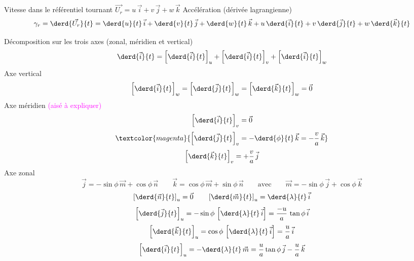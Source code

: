 \sk
Vitesse dans le référentiel tournant $\vec{U_r} = u\,\vec{i} + v\,\vec{j} + w\,\vec{k} $
\noindent Accélération (dérivée lagrangienne)
\[
\gamma_r = \derd{\vec{U_r}}{t}=\derd{u}{t}\,\vec{i}+\derd{v}{t}\,\vec{j}+\derd{w}{t}\,\vec{k} +u\,\derd{\vec{i}}{t}+v\,\derd{\vec{j}}{t}+w\,\derd{\vec{k}}{t}
\]


\sk
Décomposition sur les trois axes (zonal, méridien et vertical)
\[
\derd{\vec{i}}{t} = \left[ \derd{\vec{i}}{t} \right]_u + \left[ \derd{\vec{i}}{t} \right]_v + \left[ \derd{\vec{i}}{t} \right]_w
\]
\noindent Axe vertical
\[
\left[ \derd{\vec{i}}{t} \right]_w = \left[ \derd{\vec{j}}{t} \right]_w = \left[ \derd{\vec{k}}{t} \right]_w = \vec{0}
\]
\noindent Axe méridien \textcolor{magenta}{(aisé à expliquer)}
\[
\left[ \derd{\vec{i}}{t} \right]_v = \vec{0}
\]
\[
\textcolor{magenta}{\left[ \derd{\vec{j}}{t} \right]_v = - \derd{\phi}{t} \, \vec{k} = - \dfrac{v}{a} \, \vec{k}}
\]
\[
\left[ \derd{\vec{k}}{t} \right]_v = + \dfrac{v}{a} \, \vec{j}
\]
\noindent Axe zonal
\[
\vec{j} = -\sin\phi \, \vec{m} + \cos\phi \, \vec{n} \qquad \vec{k} =  \cos\phi \, \vec{m} + \sin\phi \, \vec{n} \qquad \textrm{avec} \qquad \vec{m} = -\sin\phi \, \vec{j} + \cos\phi \, \vec{k}
\]
\[
\left[ \derd{\vec{n}}{t} \right]_u = \vec{0} \qquad \left[ \derd{\vec{m}}{t} \right]_u = \derd{\lambda}{t} \, \vec{i}
\]
\[
\left[ \derd{\vec{j}}{t} \right]_u = -\sin\phi \, \left[ \derd{\lambda}{t} \, \vec{i} \right] = \dfrac{-u}{a} \, \tan\phi \, \vec{i}
\]
\[
\left[ \derd{\vec{k}}{t} \right]_u =  \cos\phi \, \left[ \derd{\lambda}{t} \, \vec{i} \right] = \dfrac{u}{a} \, \vec{i}
\]
\[
\left[ \derd{\vec{i}}{t} \right]_u = - \derd{\lambda}{t} \, \vec{m} = \dfrac{u}{a} \tan\phi \, \vec{j} - \dfrac{u}{a} \,\vec{k}
\]

